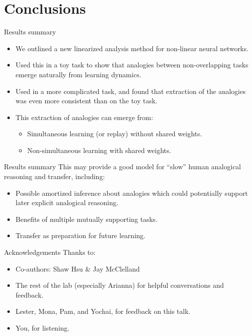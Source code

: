 \documentclass{beamer}
\begin{document}
\section{Conclusions}

\begin{frame}{Results summary}
\begin{itemize}
    \item<1-> We outlined a new linearized analysis method for non-linear neural networks. 
    \item<2-> Used this in a toy task to show that analogies between non-overlapping tasks emerge naturally from learning dynamics. 
    \item<3-> Used in a more complicated task, and found that extraction of the analogies was even more consistent than on the toy task. 
    \item<4-> This extraction of analogies can emerge from:
    \begin{itemize}
	\item<5-> Simultaneous learning (or replay) without shared weights. 
	\item<6-> Non-simultaneous learning with shared weights.
    \end{itemize}
\end{itemize}
\end{frame}

\begin{frame}{Results summary}
This may provide a good model for ``slow'' human analogical reasoning and transfer, including:
\begin{itemize}
    \item<2-> Possible amortized inference about analogies which could potentially support later explicit analogical reasoning.
    \item<3-> Benefits of multiple mutually supporting tasks.
    \item<4-> Transfer as preparation for future learning.
\end{itemize}
\end{frame}

\begin{frame}{Acknowledgements}
Thanks to:
\begin{itemize}
    \item Co-authors: Shaw Hsu \& Jay McClelland
    \item The rest of the lab (especially Arianna) for helpful conversations and feedback. 
    \item Lester, Mona, Pam, and Yochai, for feedback on this talk.
    \item You, for listening.
\end{itemize}
\end{frame}
\end{document}
